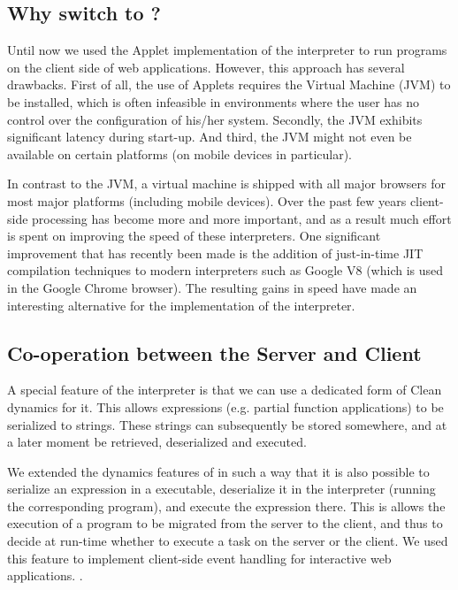 \subsection{Why switch to \JS?}
Until now we used the \Java Applet implementation of the \Sapl interpreter to
run \Clean programs on the client side of web applications. However, this
approach has several drawbacks. First of all, the use of \Java Applets requires
the \Java Virtual Machine (\textsf{JVM}) to be installed, which is often infeasible in
environments where the user has no control over the configuration of his/her
system. Secondly, the \textsf{JVM} exhibits significant latency during start-up. And
third, the \textsf{JVM} might not even be available on certain platforms (on mobile
devices in particular).

In contrast to the \textsf{JVM}, a \JavaScript virtual machine is shipped with all major 
browsers for most major platforms (including mobile devices). Over the past few
years client-side processing has become more and more important, and as a result
much effort is spent on improving the speed of these \JS interpreters. One
significant improvement that has recently been made is the addition of
just-in-time \textsf{JIT} compilation techniques to modern \JS interpreters such
as Google V8 (which is used in the Google Chrome browser). The resulting gains
in speed have made \JS an interesting alternative for the implementation of the
\Sapl interpreter.

\subsection{Co-operation between the Server and Client}
A special feature of the \Sapl interpreter is that we can use a dedicated form
of \textsf{Clean} dynamics \cite{DYNAMICS} for it. This allows \Clean expressions (e.g.
partial function applications) to be serialized to strings. These strings
can subsequently be stored somewhere, and at a later moment be retrieved,
deserialized and executed.

We extended the dynamics features of \Clean in  such a way that it is also
possible to serialize an expression in a \Clean executable, deserialize it
in the \Sapl interpreter (running the corresponding \Sapl program), and execute
the expression there. This is allows the execution of a \Clean program to be
migrated from the server to the client, and thus to decide at run-time whether
to execute a task on the server or the client. We used this feature to
implement client-side event handling for interactive web applications.
\cite{iEditors}. 
